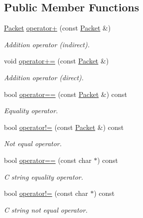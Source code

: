 \subsection*{Public Member Functions}
\begin{DoxyCompactItemize}
\item 
\hyperlink{class_packet}{Packet} \hyperlink{class_packet_a38a52f1b08658b5e1eae979967b02685}{operator+} (const \hyperlink{class_packet}{Packet} \&)
\begin{DoxyCompactList}\small\item\em Addition operator (indirect). \item\end{DoxyCompactList}\item 
void \hyperlink{class_packet_a076a46dcad5f13d44ded9efe7b16a938}{operator+=} (const \hyperlink{class_packet}{Packet} \&)
\begin{DoxyCompactList}\small\item\em Addition operator (direct). \item\end{DoxyCompactList}\item 
bool \hyperlink{class_packet_ad6ddfcae873a585902bf3fcc16054951}{operator==} (const \hyperlink{class_packet}{Packet} \&) const 
\begin{DoxyCompactList}\small\item\em Equality operator. \item\end{DoxyCompactList}\item 
bool \hyperlink{class_packet_af6db78358a62d4df2f8a5b0e890adc5b}{operator!=} (const \hyperlink{class_packet}{Packet} \&) const 
\begin{DoxyCompactList}\small\item\em Not equal operator. \item\end{DoxyCompactList}\item 
bool \hyperlink{class_packet_a466f52196626082faad1bda984b18491}{operator==} (const char $\ast$) const 
\begin{DoxyCompactList}\small\item\em C string equality operator. \item\end{DoxyCompactList}\item 
bool \hyperlink{class_packet_a31ba2c941a82fa4efdfb1527e3dbfd3b}{operator!=} (const char $\ast$) const 
\begin{DoxyCompactList}\small\item\em C string not equal operator. \item\end{DoxyCompactList}\item 

\end{DoxyCompactItemize}
